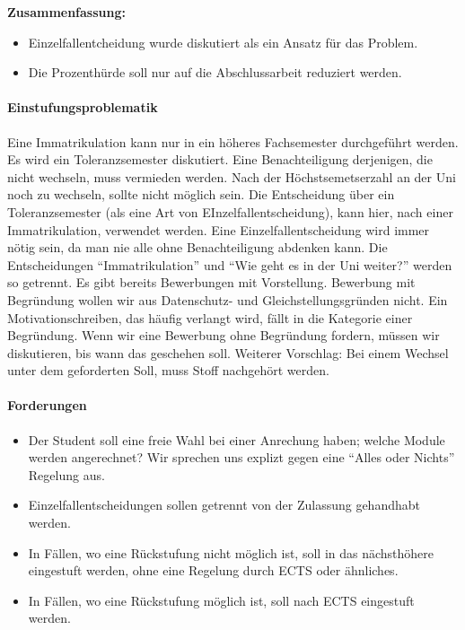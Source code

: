         \textbf{Zusammenfassung:}
        \begin{itemize}
          \item Einzelfallentcheidung wurde diskutiert als ein Ansatz für das Problem.
          \item Die Prozenthürde soll nur auf die Abschlussarbeit reduziert werden.
        \end{itemize}

      \paragraph{Einstufungsproblematik}
        Eine Immatrikulation kann nur in ein höheres Fachsemester durchgeführt werden. Es wird ein Toleranzsemester diskutiert.
        Eine Benachteiligung derjenigen, die nicht wechseln, muss vermieden werden. Nach der Höchstsemetserzahl an der Uni noch zu wechseln, sollte nicht möglich sein.
        Die Entscheidung über ein Toleranzsemester (als eine Art von EInzelfallentscheidung), kann hier, nach einer Immatrikulation, verwendet werden.
        Eine Einzelfallentscheidung wird immer nötig sein, da man nie alle ohne Benachteiligung abdenken kann. Die Entscheidungen ``Immatrikulation'' und ``Wie geht es in der Uni weiter?'' werden so getrennt.
        Es gibt bereits Bewerbungen mit Vorstellung. Bewerbung mit Begründung wollen wir aus Datenschutz- und Gleichstellungsgründen nicht.
        Ein Motivationschreiben, das häufig verlangt wird, fällt in die Kategorie einer Begründung. Wenn wir eine Bewerbung ohne Begründung fordern,
        müssen wir diskutieren, bis wann das geschehen soll. Weiterer Vorschlag: Bei einem Wechsel unter dem geforderten Soll, muss Stoff nachgehört werden.

      \paragraph{Forderungen}
        \begin{itemize}
          \item Der Student soll eine freie Wahl bei einer Anrechung haben; welche Module werden angerechnet? Wir sprechen uns explizt gegen eine ``Alles oder Nichts'' Regelung aus.
          \item Einzelfallentscheidungen sollen getrennt von der Zulassung gehandhabt werden.
          \item In Fällen, wo eine Rückstufung nicht möglich ist, soll in das nächsthöhere eingestuft werden, ohne eine Regelung durch ECTS oder ähnliches.
          \item In Fällen, wo eine Rückstufung möglich ist, soll nach ECTS eingestuft werden.
        \end{itemize}

